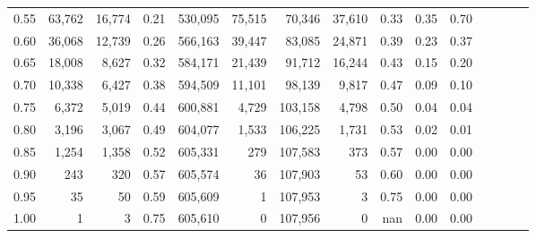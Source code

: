 \begin{tabular}{rrrcrrrrrrrrrrr}
0.55 &   63,762 &  16,774 &                                       0.21 &  530,095 &   75,515 &   70,346 &   37,610 &  0.33 &  0.35 &                         0.70 \\
0.60 &   36,068 &  12,739 &                                       0.26 &  566,163 &   39,447 &   83,085 &   24,871 &  0.39 &  0.23 &                         0.37 \\
0.65 &   18,008 &   8,627 &                                       0.32 &  584,171 &   21,439 &   91,712 &   16,244 &  0.43 &  0.15 &                         0.20 \\
0.70 &   10,338 &   6,427 &                                       0.38 &  594,509 &   11,101 &   98,139 &    9,817 &  0.47 &  0.09 &                         0.10 \\
0.75 &    6,372 &   5,019 &                                       0.44 &  600,881 &    4,729 &  103,158 &    4,798 &  0.50 &  0.04 &                         0.04 \\
0.80 &    3,196 &   3,067 &                                       0.49 &  604,077 &    1,533 &  106,225 &    1,731 &  0.53 &  0.02 &                         0.01 \\
0.85 &    1,254 &   1,358 &                                       0.52 &  605,331 &      279 &  107,583 &      373 &  0.57 &  0.00 &                         0.00 \\
0.90 &      243 &     320 &                                       0.57 &  605,574 &       36 &  107,903 &       53 &  0.60 &  0.00 &                         0.00 \\
0.95 &       35 &      50 &                                       0.59 &  605,609 &        1 &  107,953 &        3 &  0.75 &  0.00 &                         0.00 \\
1.00 &        1 &       3 &                                       0.75 &  605,610 &        0 &  107,956 &        0 &   nan &  0.00 &                         0.00 \\
\bottomrule
\end{tabular}
